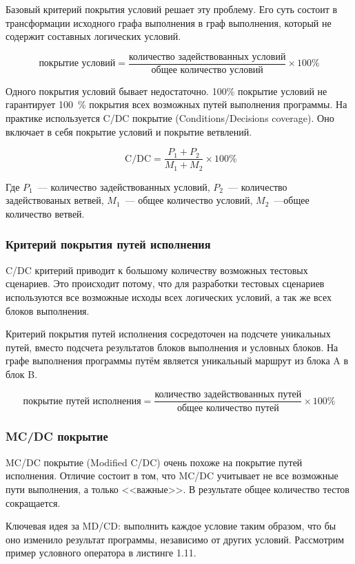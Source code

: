 Базовый критерий покрытия условий решает эту проблему. Его суть состоит в трансформации исходного графа выполнения в граф выполнения, который не содержит составных логических условий. 

\[ \text{покрытие условий} = \frac{\text{количество задействованных условий}}{\text{общее количество условий}}  \times 100 \% \]

Одного покрытия условий бывает недостаточно. 100\% покрытие условий не гарантирует 100~\% покрытия всех возможных путей выполнения программы. На практике используется C/DC покрытие (Conditions/Decisions coverage). Оно включает в себя покрытие условий и покрытие ветвлений.

\[ \text{ C/DC} = \frac{P_1 + P_2}{M_1 + M_2} \times 100 \% \]

Где \(P_1\)~--- количество задействованных условий, \(P_2\)~--- количество задействованых ветвей, \(M_1\)~--- общее количество условий, \(M_2\)~---общее количество ветвей.

\subsubsection{Критерий покрытия путей исполнения}

C/DC критерий приводит к большому количеству возможных тестовых сценариев. Это происходит потому, что для разработки тестовых сценариев используются все возможные исходы всех логических условий, а так же всех блоков выполнения.

Критерий покрытия путей исполнения сосредоточен на подсчете уникальных путей, вместо подсчета результатов блоков выполнения и условных блоков. На графе выполнения программы путём является уникальный маршрут из блока A в блок B.

\[ \text{покрытие путей исполнения} = \frac{\text{количество задействованных путей}}{\text{общее количество путей}}  \times 100 \% \]

\subsubsection{MC/DC покрытие}

MC/DC покрытие (Modified C/DC) очень похоже на покрытие путей исполнения. Отличие состоит в том, что MC/DC учитывает не все возможные пути выполнения, а только <<важные>>. В результате общее количество тестов сокращается.

Ключевая идея за MD/CD: выполнить каждое условие таким образом, что бы оно изменило результат программы, независимо от других условий. Рассмотрим пример условного оператора в листинге 1.11.


